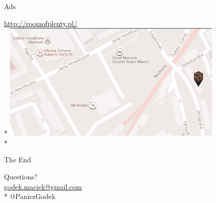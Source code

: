 \documentclass{beamer}
\begin{document}
\begin{frame}{Ads}
  \begin{center}
    \huge{\url{http://roomofplenty.pl/}}\\*
    \includegraphics[width=0.8\textwidth]{plenty.png}\\*
  \end{center}
\end{frame}

\begin{frame}{The End}
  \begin{center}
    \huge{Questions?}\\%
    \normalsize{\href{mailto:godek.maciek@gmail.com}{godek.maciek@gmail.com}}\\*
    \normalsize{@PaniczGodek}
  \end{center}
\end{frame}
\end{document}
